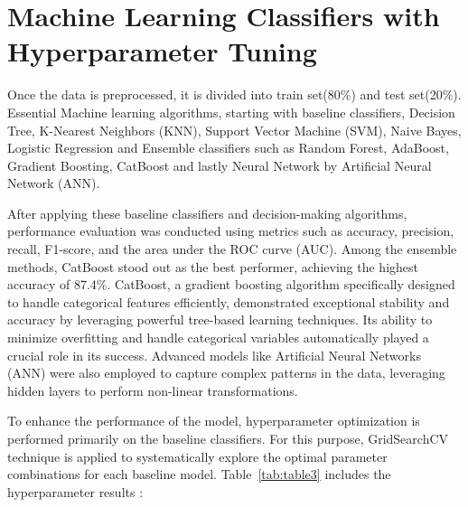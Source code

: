 \documentclass[pt]{article}  %
\begin{document}
\section{Machine Learning Classifiers with Hyperparameter Tuning}
Once the data is preprocessed, it is divided into train set(80\%) and test set(20\%). Essential Machine learning algorithms, starting with baseline classifiers, Decision Tree, K-Nearest Neighbors (KNN), Support Vector Machine (SVM), Naive Bayes, Logistic Regression and Ensemble classifiers such as Random Forest, AdaBoost, Gradient Boosting, CatBoost and lastly Neural Network by Artificial Neural Network (ANN).

After applying these baseline classifiers and decision-making algorithms, performance evaluation was conducted using metrics such as accuracy, precision, recall, F1-score, and the area under the ROC curve (AUC). Among the ensemble methods, CatBoost stood out as the best performer, achieving the highest accuracy of 87.4\%. CatBoost, a gradient boosting algorithm specifically designed to handle categorical features efficiently, demonstrated exceptional stability and accuracy by leveraging powerful tree-based learning techniques. Its ability to minimize overfitting and handle categorical variables automatically played a crucial role in its success. Advanced models like Artificial Neural Networks (ANN) were also employed to capture complex patterns in the data, leveraging hidden layers to perform non-linear transformations. 

To enhance the performance of the model, hyperparameter optimization is performed primarily on the baseline classifiers. For this purpose, GridSearchCV technique is applied to systematically explore the optimal parameter combinations for each baseline model. Table~\ref{tab:table3} includes the hyperparameter results :\vspace{0.5cm}
\end{document}

